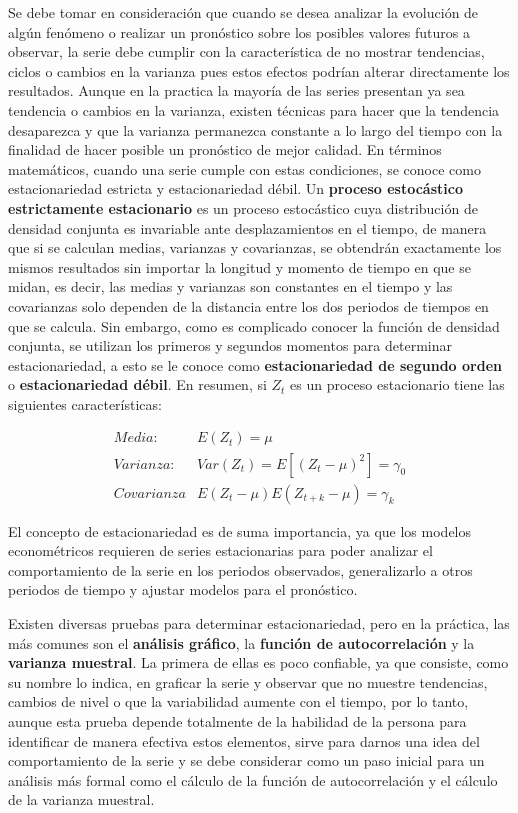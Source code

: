 Se debe tomar en consideración que cuando se desea analizar la evolución de algún fenómeno o realizar un pronóstico sobre los posibles valores futuros a observar, la serie debe cumplir con la característica de no mostrar tendencias, ciclos o cambios en la varianza  pues estos efectos podrían alterar directamente los resultados. Aunque en la practica la mayoría de las series presentan ya sea tendencia o cambios en la varianza, existen técnicas para hacer que la tendencia desaparezca y que la varianza permanezca constante a lo largo del tiempo con la finalidad de hacer posible un pronóstico de mejor calidad. En términos matemáticos, cuando una serie cumple con estas condiciones, se conoce como estacionariedad estricta y estacionariedad débil. Un \textbf{proceso estocástico estrictamente estacionario} es un proceso estocástico cuya distribución de densidad conjunta es invariable ante desplazamientos en el tiempo, de manera que si se calculan medias, varianzas y covarianzas, se obtendrán exactamente los mismos resultados sin importar la longitud y momento de tiempo en que se midan, es decir, las medias y varianzas son constantes en el tiempo y las covarianzas  solo dependen de la distancia entre los dos periodos de tiempos en que se calcula. Sin embargo, como es complicado conocer la función de densidad conjunta, se utilizan los primeros y segundos momentos para determinar estacionariedad, a esto se le conoce como \textbf{estacionariedad de segundo orden } o \textbf{estacionariedad débil}. En resumen, si $Z_t$ es un proceso estacionario tiene las siguientes características:

\begin{eqnarray}
        Media: & E(Z_t)=\mu  \nonumber \\ 
        Varianza:  & Var(Z_t)=E[(Z_t- \mu )^2]=\gamma_0   \\ 
        Covarianza & E(Z_t-\mu)E(Z_{t+k}-\mu)=\gamma_k  \nonumber 
\end{eqnarray} 

El concepto de estacionariedad es de suma importancia, ya que los modelos econométricos requieren de series estacionarias para poder analizar el comportamiento de la serie en los periodos observados, generalizarlo a otros periodos de tiempo y ajustar modelos para el pronóstico.\newline

Existen diversas pruebas para determinar estacionariedad, pero en la práctica, las más comunes son el \textbf{análisis gráfico}, la \textbf{función de autocorrelación} y la \textbf{varianza muestral}. La primera de ellas es poco confiable, ya que consiste, como su nombre lo indica, en graficar la serie y observar que no muestre tendencias, cambios de nivel o que la variabilidad aumente con el tiempo, por lo tanto, aunque esta prueba depende totalmente de la habilidad de la persona para identificar de manera efectiva estos elementos, sirve para darnos una idea del comportamiento de la serie y se debe considerar como un paso inicial para un análisis más formal como el cálculo de la función de autocorrelación y el cálculo de la varianza muestral.\newline

